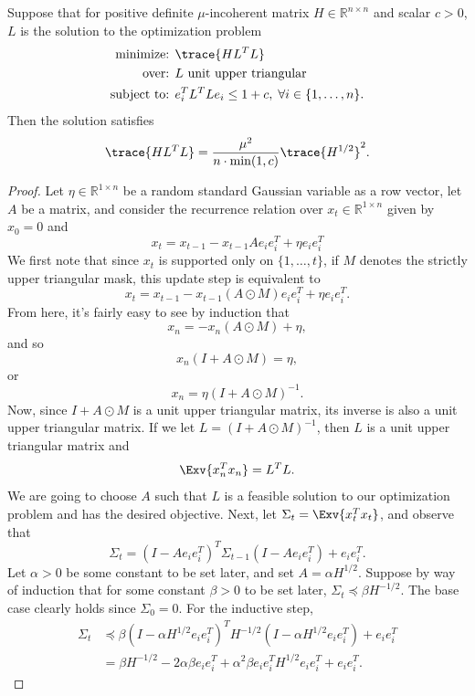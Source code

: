 \begin{toappendix}
\begin{lemma}
Suppose that for positive definite $\mu$-incoherent matrix $H \in \mathbb{R}^{n \times n}$ and scalar $c > 0$, $L$ is the solution to the optimization problem
\begin{align*}
    \mbox{minimize: } & \trace{H L^T L} \\
    \mbox{over: } & L \text{ unit upper triangular} \\
    \mbox{subject to: } & e_i^T L^T L e_i \le 1 + c, \; \forall i \in \{1,\ldots,n\}.
\end{align*}
Then the solution satisfies
\[
	\trace{H L^T L} = \frac{\mu^2}{n \cdot \min(1,c)} \trace{H^{1/2}}^2.
\]
\end{lemma}
\begin{proof}
Let $\eta \in \mathbb{R}^{1 \times n}$ be a random standard Gaussian variable as a row vector, let $A$ be a matrix, and consider the recurrence relation over $x_t \in \mathbb{R}^{1 \times n}$ given by $x_0 = 0$ and
\[
	x_t = x_{t-1} - x_{t-1} A e_i e_i^T + \eta e_i e_i^T 
\]
We first note that since $x_t$ is supported only on $\{1,\ldots,t\}$, if $M$ denotes the strictly upper triangular mask, this update step is equivalent to
\[
	x_t = x_{t-1} - x_{t-1} (A \odot M) e_i e_i^T + \eta e_i e_i^T.
\]
From here, it's fairly easy to see by induction that
\[
	x_n = -x_n (A \odot M) + \eta,
\]
and so
\[
	x_n (I + A \odot M) = \eta,
\]
or
\[
	x_n = \eta (I + A \odot M)^{-1}.
\]
Now, since $I + A \odot M$ is a unit upper triangular matrix, its inverse is also a unit upper triangular matrix. If we let $L = (I + A \odot M)^{-1}$, then $L$ is a unit upper triangular matrix and
\[
	\Exv{x_n^T x_n} = L^T L.
\]
We are going to choose $A$ such that $L$ is a feasible solution to our optimization problem and has the desired objective.
Next, let $\Sigma_t = \Exv{x_t^T x_t}$, and observe that
\[
	\Sigma_t = \left( I - A e_i e_i^T \right)^T \Sigma_{t-1} \left( I - A e_i e_i^T \right) + e_i e_i^T.
\]
Let $\alpha > 0$ be some constant to be set later, and set $A = \alpha H^{1/2}$. Suppose by way of induction that for some constant $\beta > 0$ to be set later, $\Sigma_t \preceq \beta H^{-1/2}$.
The base case clearly holds since $\Sigma_0 = 0$. For the inductive step,
\begin{align*}
	\Sigma_t 
	&\preceq 
	\beta \left( I - \alpha H^{1/2} e_i e_i^T \right)^T H^{-1/2} \left( I - \alpha H^{1/2} e_i e_i^T \right) + e_i e_i^T
	\\&= 
	\beta H^{-1/2} - 2 \alpha \beta e_i e_i^T + \alpha^2 \beta e_i e_i^T H^{1/2} e_i e_i^T + e_i e_i^T.

\end{align*}
\end{proof}
\end{toappendix}
